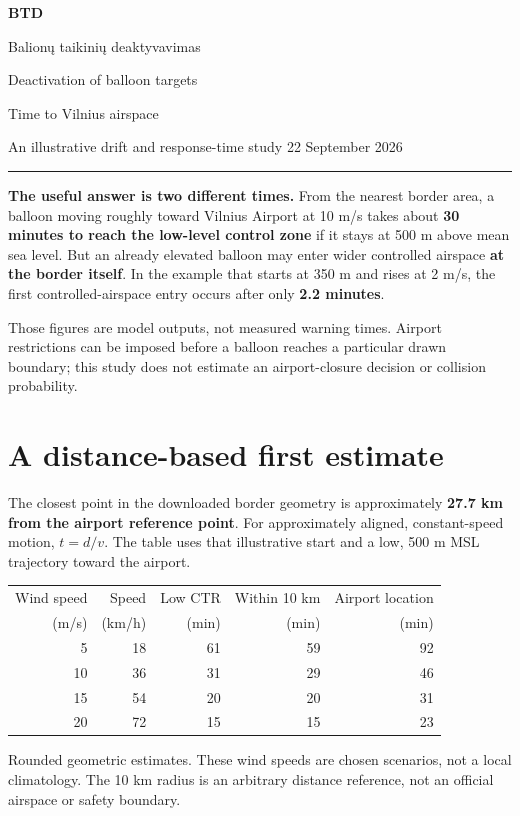 \documentclass[11pt,a4paper]{article}
\begin{document}
{\sffamily\LARGE\bfseries BTD}\par
{\large Balion\k{u} taikini\k{u} deaktyvavimas}\par
{\small Deactivation of balloon targets}\par
\vspace{4mm}
{\sffamily\Large Time to Vilnius airspace}\par
{\small An illustrative drift and response-time study \hfill 22 September 2026}
\vspace{3mm}\hrule\vspace{4mm}

\textbf{The useful answer is two different times.} From the nearest border area, a balloon moving roughly toward Vilnius Airport at 10 m/s takes about \textbf{30 minutes to reach the low-level control zone} if it stays at 500 m above mean sea level. But an already elevated balloon may enter wider controlled airspace \textbf{at the border itself}. In the example that starts at 350 m and rises at 2 m/s, the first controlled-airspace entry occurs after only \textbf{2.2 minutes}.

Those figures are model outputs, not measured warning times. Airport restrictions can be imposed before a balloon reaches a particular drawn boundary; this study does not estimate an airport-closure decision or collision probability.

\section*{A distance-based first estimate}
The closest point in the downloaded border geometry is approximately \textbf{27.7 km from the airport reference point}. For approximately aligned, constant-speed motion, $t=d/v$. The table uses that illustrative start and a low, 500 m MSL trajectory toward the airport.

\begin{center}\small
\begin{tabular}{rrrrr}\toprule
Wind speed & Speed & Low CTR & Within 10 km & Airport location\\
(m/s) & (km/h) & (min) & (min) & (min)\\\midrule
5 & 18 & 61 & 59 & 92\\
10 & 36 & 31 & 29 & 46\\
15 & 54 & 20 & 20 & 31\\
20 & 72 & 15 & 15 & 23\\\bottomrule
\end{tabular}\end{center}
{\small Rounded geometric estimates. These wind speeds are chosen scenarios, not a local climatology. The 10 km radius is an arbitrary distance reference, not an official airspace or safety boundary.}
\end{document}
